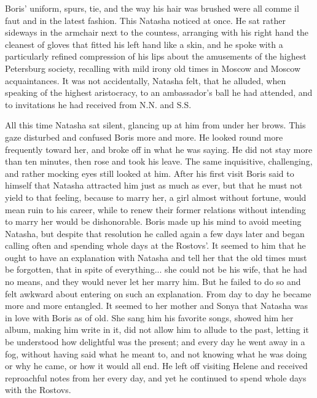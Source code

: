 Boris' uniform, spurs, tie, and the way his hair was brushed were
all comme il faut and in the latest fashion. This Natasha noticed
at once.  He sat rather sideways in the armchair next to the
countess, arranging with his right hand the cleanest of gloves
that fitted his left hand like a skin, and he spoke with a
particularly refined compression of his lips about the amusements
of the highest Petersburg society, recalling with mild irony old
times in Moscow and Moscow acquaintances. It was not
accidentally, Natasha felt, that he alluded, when speaking of the
highest aristocracy, to an ambassador's ball he had attended, and
to invitations he had received from N.N. and S.S.

All this time Natasha sat silent, glancing up at him from under
her brows. This gaze disturbed and confused Boris more and
more. He looked round more frequently toward her, and broke off
in what he was saying.  He did not stay more than ten minutes,
then rose and took his leave. The same inquisitive, challenging,
and rather mocking eyes still looked at him. After his first
visit Boris said to himself that Natasha attracted him just as
much as ever, but that he must not yield to that feeling, because
to marry her, a girl almost without fortune, would mean ruin to
his career, while to renew their former relations without
intending to marry her would be dishonorable. Boris made up his
mind to avoid meeting Natasha, but despite that resolution he
called again a few days later and began calling often and
spending whole days at the Rostovs'. It seemed to him that he
ought to have an explanation with Natasha and tell her that the
old times must be forgotten, that in spite of everything...  she
could not be his wife, that he had no means, and they would never
let her marry him. But he failed to do so and felt awkward about
entering on such an explanation. From day to day he became more
and more entangled. It seemed to her mother and Sonya that
Natasha was in love with Boris as of old. She sang him his
favorite songs, showed him her album, making him write in it, did
not allow him to allude to the past, letting it be understood how
delightful was the present; and every day he went away in a fog,
without having said what he meant to, and not knowing what he was
doing or why he came, or how it would all end. He left off
visiting Helene and received reproachful notes from her every
day, and yet he continued to spend whole days with the Rostovs.


